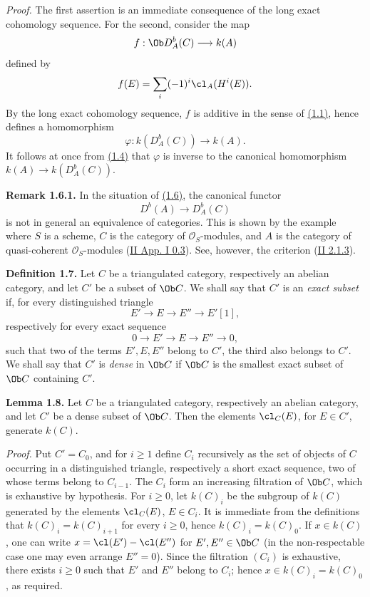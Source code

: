 \emph{Proof.} The first assertion is an immediate consequence of the long exact cohomology sequence. For the second, consider the map
\[
 f:\Ob D_A^b(C)\longrightarrow k(A)
\]
defined by
\[
 f(E)=\sum_i(-1)^i\cl_A(H^i(E)).
\]
By the long exact cohomology sequence, \(f\) is additive in the sense of \hyperlink{sga6.e04.para.1-1}{(1.1)}, hence defines a homomorphism
\[
 \varphi:k(D_A^b(C))\longrightarrow k(A).
\]
It follows at once from \hyperlink{sga6.e04.lem.1-4}{(1.4)} that \(\varphi\) is inverse to the canonical homomorphism \(k(A)\to k(D_A^b(C))\).

\textbf{Remark 1.6.1.} In the situation of \hyperlink{sga6.e04.lem.1-6}{(1.6)}, the canonical functor
\[
 D^b(A)\longrightarrow D_A^b(C)
\]
is not in general an equivalence of categories. This is shown by the example where \(S\) is a scheme, \(C\) is the category of \(\mathcal O_S\)-modules, and \(A\) is the category of quasi-coherent \(\mathcal O_S\)-modules (\hyperlink{sga6.e02.para.0-3}{II App. I 0.3}). See, however, the criterion (\hyperlink{sga6.e02.lem.2-1-3}{II 2.1.3}).

\textbf{Definition 1.7.} Let \(C\) be a triangulated category, respectively an abelian category, and let \(C'\) be a subset of \(\Ob C\). We shall say that \(C'\) is an \emph{exact subset} if, for every distinguished triangle
\[
 E'\longrightarrow E\longrightarrow E''\longrightarrow E'[1],
\]
respectively for every exact sequence
\[
 0\longrightarrow E'\longrightarrow E\longrightarrow E''\longrightarrow0,
\]
such that two of the terms \(E',E,E''\) belong to \(C'\), the third also belongs to \(C'\). We shall say that \(C'\) is \emph{dense} in \(\Ob C\) if \(\Ob C\) is the smallest exact subset of \(\Ob C\) containing \(C'\).

\textbf{Lemma 1.8.} Let \(C\) be a triangulated category, respectively an abelian category, and let \(C'\) be a dense subset of \(\Ob C\). Then the elements \(\cl_C(E)\), for \(E\in C'\), generate \(k(C)\).

\emph{Proof.} Put \(C'=C_0\), and for \(i\geq1\) define \(C_i\) recursively as the set of objects of \(C\) occurring in a distinguished triangle, respectively a short exact sequence, two of whose terms belong to \(C_{i-1}\). The \(C_i\) form an increasing filtration of \(\Ob C\), which is exhaustive by hypothesis. For \(i\geq0\), let \(k(C)_i\) be the subgroup of \(k(C)\) generated by the elements \(\cl_C(E)\), \(E\in C_i\). It is immediate from the definitions that \(k(C)_i=k(C)_{i+1}\) for every \(i\geq0\), hence \(k(C)_i=k(C)_0\). If \(x\in k(C)\), one can write \(x=\cl(E')-\cl(E'')\) for \(E',E''\in\Ob C\) (in the non-respectable case one may even arrange \(E''=0\)). Since the filtration \((C_i)\) is exhaustive, there exists \(i\geq0\) such that \(E'\) and \(E''\) belong to \(C_i\); hence \(x\in k(C)_i=k(C)_0\), as required.

